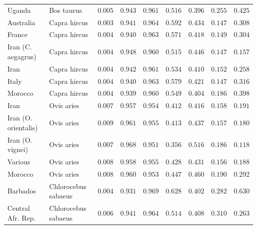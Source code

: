\documentclass{article}
\begin{document}
\begin{table}[tb]
\begin{adjustbox}{width=\textwidth}
\begin{tabular}{||l|l|r||r|r||r|r||r|r||}
                Uganda                & Bos taurus        & $ 0.005$ & $ 0.943$ & $ 0.961$ & $ 0.516$ & $ 0.396$ & $ 0.255$ & $ 0.425$ \\
                \rowcolor{LIGHTGREY} Australia              & Capra hircus        & $ 0.003$ & $ 0.941$ & $ 0.964$ & $ 0.592$ & $ 0.434$ & $ 0.147$ & $ 0.308$ \\
                \rowcolor{LIGHTGREY} France                 & Capra hircus          & $ 0.004$ & $ 0.940$ & $ 0.963$ & $ 0.571$ & $ 0.418$ & $ 0.149$ & $ 0.304$ \\
                \rowcolor{LIGHTGREY} Iran (C. aegagrus) & Capra hircus          & $ 0.004$ & $ 0.948$ & $ 0.960$ & $ 0.515$ & $ 0.446$ & $ 0.147$ & $ 0.157$ \\
                \rowcolor{LIGHTGREY} Iran     & Capra hircus          & $ 0.004$ & $ 0.942$ & $ 0.961$ & $ 0.534$ & $ 0.410$ & $ 0.152$ & $ 0.258$ \\
                \rowcolor{LIGHTGREY} Italy              & Capra hircus          & $ 0.004$ & $ 0.940$ & $ 0.963$ & $ 0.579$ & $ 0.421$ & $ 0.147$ & $ 0.316$ \\
                Morocco              & Capra hircus          & $ 0.004$ & $ 0.939$ & $ 0.960$ & $ 0.549$ & $ 0.404$ & $ 0.186$ & $ 0.398$ \\
                Iran             & Ovis aries & $ 0.007$ & $ 0.957$ & $ 0.954$ & $ 0.412$ & $ 0.416$ & $ 0.158$ & $ 0.191$ \\
                Iran (O. orientalis)    & Ovis aries & $ 0.009$ & $ 0.961$ & $ 0.955$ & $ 0.413$ & $ 0.437$ & $ 0.157$ & $ 0.180$ \\
                Iran (O. vignei)             & Ovis aries & $ 0.007$ & $ 0.968$ & $ 0.951$ & $ 0.356$ & $ 0.516$ & $ 0.186$ & $ 0.118$ \\
                Various               & Ovis aries & $ 0.008$ & $ 0.958$ & $ 0.955$ & $ 0.428$ & $ 0.431$ & $ 0.156$ & $ 0.188$ \\
                Morocco                & Ovis aries & $ 0.008$ & $ 0.960$ & $ 0.953$ & $ 0.447$ & $ 0.460$ & $ 0.190$ & $ 0.292$ \\
                \rowcolor{LIGHTGREY} Barbados                & Chlorocebus sabaeus & $ 0.004$ & $ 0.931$ & $ 0.969$ & $ 0.628$ & $ 0.402$ & $ 0.282$ & $ 0.630$ \\
                \rowcolor{LIGHTGREY} Central Afr. Rep.         & Chlorocebus sabaeus & $ 0.006$ & $ 0.941$ & $ 0.964$ & $ 0.514$ & $ 0.408$ & $ 0.310$ & $ 0.263$ \\

\end{tabular}
\end{adjustbox}
\end{table}
\end{document}
